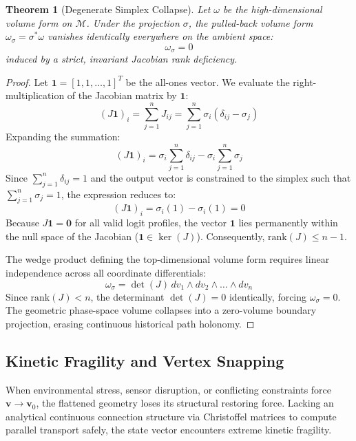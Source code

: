 \documentclass{article}
\newtheorem{theorem}{Theorem}
\newcommand{\M}{\mathcal{M}}
\newcommand{\omegaSigma}{\omega_{\sigma}}
\begin{document}
\begin{theorem}[Degenerate Simplex Collapse]
Let $\omega$ be the high-dimensional volume form on $\M$. Under the projection $\sigma$, the pulled-back volume form $\omegaSigma = \sigma^* \omega$ vanishes identically everywhere on the ambient space:
\begin{equation}
    \omegaSigma = 0
\end{equation}
induced by a strict, invariant Jacobian rank deficiency.
\end{theorem}

\begin{proof}
Let $\bm{1} = [1, 1, \dots, 1]^T$ be the all-ones vector. We evaluate the right-multiplication of the Jacobian matrix by $\bm{1}$:
\begin{equation}
    (J \bm{1})_i = \sum_{j=1}^n J_{ij} = \sum_{j=1}^n \sigma_i (\delta_{ij} - \sigma_j)
\end{equation}
Expanding the summation:
\begin{equation}
    (J \bm{1})_i = \sigma_i \sum_{j=1}^n \delta_{ij} - \sigma_i \sum_{j=1}^n \sigma_j
\end{equation}
Since $\sum_{j=1}^n \delta_{ij} = 1$ and the output vector is constrained to the simplex such that $\sum_{j=1}^n \sigma_j = 1$, the expression reduces to:
\begin{equation}
    (J \bm{1})_i = \sigma_i (1) - \sigma_i (1) = 0
\end{equation}
Because $J \bm{1} = \bm{0}$ for all valid logit profiles, the vector $\bm{1}$ lies permanently within the null space of the Jacobian ($\bm{1} \in \ker(J)$). Consequently, $\text{rank}(J) \leq n - 1$. 

The wedge product defining the top-dimensional volume form requires linear independence across all coordinate differentials:
\begin{equation}
    \omegaSigma = \det(J) \, dv_1 \wedge dv_2 \wedge \dots \wedge dv_n
\end{equation}
Since $\text{rank}(J) < n$, the determinant $\det(J) = 0$ identically, forcing $\omegaSigma = 0$. The geometric phase-space volume collapses into a zero-volume boundary projection, erasing continuous historical path holonomy.
\end{proof}

\subsection{Kinetic Fragility and Vertex Snapping}
When environmental stress, sensor disruption, or conflicting constraints force $\bm{v} \to \bm{v}_0$, the flattened geometry loses its structural restoring force. Lacking an analytical continuous connection structure via Christoffel matrices to compute parallel transport safely, the state vector encounters extreme kinetic fragility. 
\end{document}
